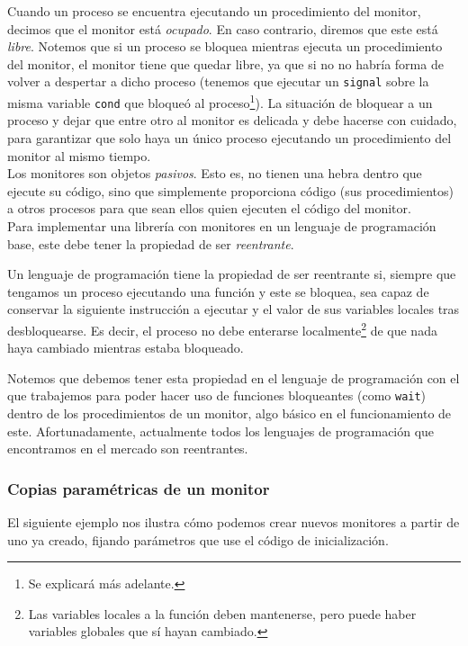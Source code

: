 Cuando un proceso se encuentra ejecutando un procedimiento del monitor, decimos que el monitor está \emph{ocupado}. En caso contrario, diremos que este está \emph{libre}. Notemos que si un proceso se bloquea mientras ejecuta un procedimiento del monitor, el monitor tiene que quedar libre, ya que si no no habría forma de volver a despertar a dicho proceso (tenemos que ejecutar un \verb|signal| sobre la misma variable \verb|cond| que bloqueó al proceso\footnote{Se explicará más adelante.}). La situación de bloquear a un proceso y dejar que entre otro al monitor es delicada y debe hacerse con cuidado, para garantizar que solo haya un único proceso ejecutando un procedimiento del monitor al mismo tiempo.\\

Los monitores son objetos \emph{pasivos}. Esto es, no tienen una hebra dentro que ejecute su código, sino que simplemente proporciona código (sus procedimientos) a otros procesos para que sean ellos quien ejecuten el código del monitor.\\

Para implementar una librería con monitores en un lenguaje de programación base, este debe tener la propiedad de ser \emph{reentrante}.
\begin{definicion}
    Un lenguaje de programación tiene la propiedad de ser reentrante si, siempre que tengamos un proceso ejecutando una función y este se bloquea, sea capaz de conservar la siguiente instrucción a ejecutar y el valor de sus variables locales tras desbloquearse. Es decir, el proceso no debe enterarse localmente\footnote{Las variables locales a la función deben mantenerse, pero puede haber variables globales que sí hayan cambiado.} de que nada haya cambiado mientras estaba bloqueado.
\end{definicion}
Notemos que debemos tener esta propiedad en el lenguaje de programación con el que trabajemos para poder hacer uso de funciones bloqueantes (como \verb|wait|) dentro de los procedimientos de un monitor, algo básico en el funcionamiento de este. Afortunadamente, actualmente todos los lenguajes de programación que encontramos en el mercado son reentrantes.\\

\subsubsection{Copias paramétricas de un monitor}
El siguiente ejemplo nos ilustra cómo podemos crear nuevos monitores a partir de uno ya creado, fijando parámetros que use el código de inicialización.

